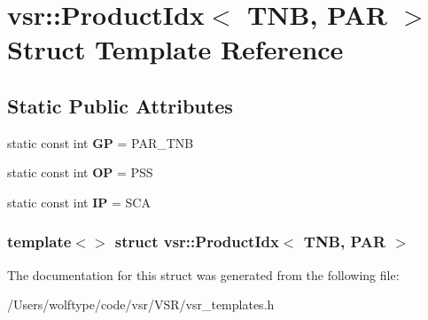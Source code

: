 \hypertarget{structvsr_1_1_product_idx_3_01_t_n_b_00_01_p_a_r_01_4}{\section{vsr\-:\-:Product\-Idx$<$ T\-N\-B, P\-A\-R $>$ Struct Template Reference}
\label{structvsr_1_1_product_idx_3_01_t_n_b_00_01_p_a_r_01_4}
}
\subsection*{Static Public Attributes}
\begin{DoxyCompactItemize}
\item 
\hypertarget{structvsr_1_1_product_idx_3_01_t_n_b_00_01_p_a_r_01_4_a96f02c19ee837cf8617fed5167ef41e8}{static const int {\bfseries G\-P} = P\-A\-R\-\_\-\-T\-N\-B}\label{structvsr_1_1_product_idx_3_01_t_n_b_00_01_p_a_r_01_4_a96f02c19ee837cf8617fed5167ef41e8}

\item 
\hypertarget{structvsr_1_1_product_idx_3_01_t_n_b_00_01_p_a_r_01_4_ad964980849be17bac4d3f1d3836533c6}{static const int {\bfseries O\-P} = P\-S\-S}\label{structvsr_1_1_product_idx_3_01_t_n_b_00_01_p_a_r_01_4_ad964980849be17bac4d3f1d3836533c6}

\item 
\hypertarget{structvsr_1_1_product_idx_3_01_t_n_b_00_01_p_a_r_01_4_a15e16827f59239188a3447525118a288}{static const int {\bfseries I\-P} = S\-C\-A}\label{structvsr_1_1_product_idx_3_01_t_n_b_00_01_p_a_r_01_4_a15e16827f59239188a3447525118a288}

\end{DoxyCompactItemize}
\subsubsection*{template$<$$>$ struct vsr\-::\-Product\-Idx$<$ T\-N\-B, P\-A\-R $>$}



The documentation for this struct was generated from the following file\-:\begin{DoxyCompactItemize}
\item 
/\-Users/wolftype/code/vsr/\-V\-S\-R/vsr\-\_\-templates.\-h\end{DoxyCompactItemize}
